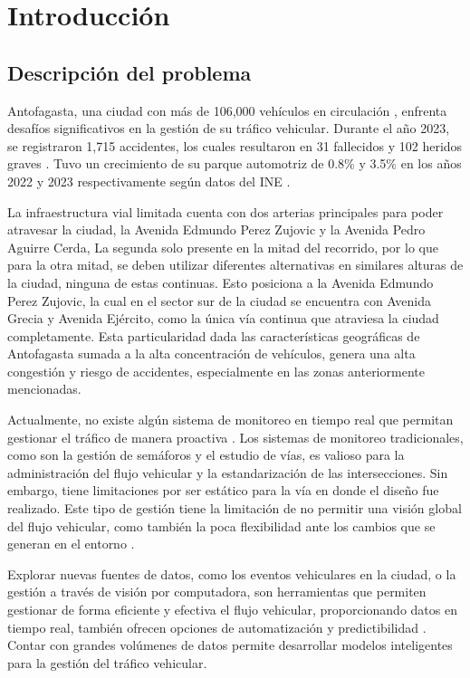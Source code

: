 \documentclass[12pt]{article}
\begin{document}
\section{Introducción}
\subsection{Descripción del problema}

Antofagasta, una ciudad con más de 106,000 vehículos en circulación \citep{comision2023}, enfrenta desafíos significativos en la gestión de su tráfico vehicular. Durante el año 2023, se registraron 1,715 accidentes, los cuales resultaron en 31 fallecidos y 102 heridos graves \citep{comision2023}. Tuvo un crecimiento de su parque automotriz de 0.8\% y 3.5\% en los años 2022 y 2023 respectivamente según datos del INE \citep{ine2023}.

La infraestructura vial limitada cuenta con dos arterias principales para poder atravesar la ciudad, la Avenida Edmundo Perez Zujovic y la Avenida Pedro Aguirre Cerda, La segunda solo presente en la mitad del recorrido, por lo que para la otra mitad, se deben utilizar diferentes alternativas en similares alturas de la ciudad, ninguna de estas continuas. Esto posiciona a la Avenida Edmundo Perez Zujovic, la cual en el sector sur de la ciudad se encuentra con Avenida Grecia y Avenida Ejército, como la única vía continua que atraviesa la ciudad completamente. Esta particularidad dada las características geográficas de Antofagasta sumada a la alta concentración de vehículos, genera una alta congestión y  riesgo de accidentes, especialmente en las zonas anteriormente mencionadas.

Actualmente, no existe algún sistema de monitoreo en tiempo real que permitan gestionar el tráfico de manera proactiva \citep{goodall2019}. Los sistemas de monitoreo tradicionales, como son la gestión de semáforos y el estudio de vías, es valioso para la administración del flujo vehicular y la estandarización de las intersecciones. Sin embargo, tiene limitaciones por ser estático para la vía en donde el diseño fue realizado. Este tipo de gestión tiene la limitación de no permitir una visión global del flujo vehicular, como también la poca flexibilidad ante los cambios que se generan en el entorno \citep{auld2009}.

Explorar nuevas fuentes de datos, como los eventos vehiculares en la ciudad, o la gestión a través de visión por computadora, son herramientas que permiten gestionar de forma eficiente y efectiva el flujo vehicular, proporcionando datos en tiempo real, también ofrecen opciones de automatización y predictibilidad \citep{chen2015}. Contar con grandes volúmenes de datos permite desarrollar modelos inteligentes para la gestión del tráfico vehicular.
\end{document}
